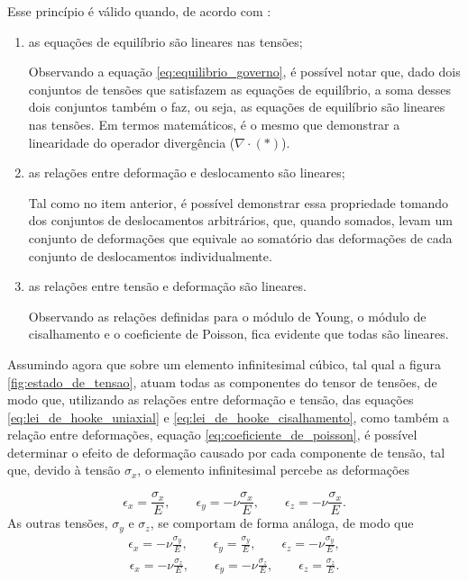 Esse princípio é válido quando, de acordo com \cite{lub}:
\begin{enumerate}
    \item as equações de equilíbrio são lineares nas tensões;
        
    Observando a equação \ref{eq:equilibrio_governo}, é possível notar que, dado dois conjuntos de tensões que satisfazem as equações de equilíbrio, a soma desses dois conjuntos também o faz, ou seja, as equações de equilíbrio são lineares nas tensões. Em termos matemáticos, é o mesmo que demonstrar a linearidade do operador divergência ($\nabla \cdot (*)$).
    \item as relações entre deformação e deslocamento são lineares;
        
    Tal como no item anterior, é possível demonstrar essa propriedade tomando dos conjuntos de deslocamentos arbitrários, que, quando somados, levam um conjunto de deformações que equivale ao somatório das deformações de cada conjunto de deslocamentos individualmente.
    \item as relações entre tensão e deformação são lineares.
        
    Observando as relações definidas para o módulo de Young, o módulo de cisalhamento e o coeficiente de Poisson, fica evidente que todas são lineares.
\end{enumerate}

Assumindo agora que sobre um elemento infinitesimal cúbico, tal qual a figura \ref{fig:estado_de_tensao}, atuam todas as componentes do tensor de tensões, de modo que, utilizando as relações entre deformação e tensão, das equações \ref{eq:lei_de_hooke_uniaxial} e \ref{eq:lei_de_hooke_cisalhamento}, como também a relação entre deformações, equação \ref{eq:coeficiente_de_poisson}, é possível determinar o efeito de deformação causado por cada componente de tensão, tal que, devido à tensão $\sigma_x$, o elemento infinitesimal percebe as deformações

\begin{equation}
    \epsilon_x =\frac{\sigma_x}{E}, \qquad \epsilon_y = -\nu \frac{\sigma_x}{E}, \qquad \epsilon_z = -\nu \frac{\sigma_x}{E}.
\end{equation}
As outras tensões, $\sigma_y$ e $\sigma_z$, se comportam de forma análoga, de modo que
\begin{gather}
    \epsilon_x =-\nu \frac{\sigma_y}{E}, \qquad \epsilon_y = \frac{\sigma_y}{E}, \qquad \epsilon_z = -\nu \frac{\sigma_y}{E}, 
\end{gather}
\begin{gather}
    \epsilon_x =-\nu \frac{\sigma_z}{E}, \qquad \epsilon_y = -\nu \frac{\sigma_z}{E}, \qquad \epsilon_z = \frac{\sigma_z}{E}.
\end{gather}

